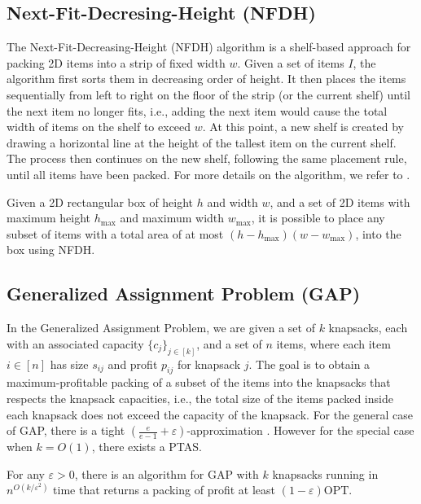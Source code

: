 \documentclass[a4paper,UKenglish,cleveref, autoref, thm-restate]{lipics-v2021}
\newcommand{\eps}{\varepsilon}
\newcommand{\opt}{\mathrm{OPT}}
\begin{document}
\subsection{Next-Fit-Decresing-Height (NFDH)}
\label{appx:NFDH}

The Next-Fit-Decreasing-Height (NFDH) algorithm is a shelf-based approach for packing 2D items into a strip of fixed width $w$. Given a set of items $I$, the algorithm first sorts them in decreasing order of height.
It then places the items sequentially from left to right on the floor of the strip (or the current shelf) until the next item no longer fits, i.e., adding the next item would cause the total width of items on the shelf to exceed $w$. At this point, a new shelf is created by drawing a horizontal line at the height of the tallest item on the current shelf. The process then continues on the new shelf, following the same placement rule, until all items have been packed.
For more details on the algorithm, we refer to \cite{coffman1980performance, christensen2016multidimensional}.


\begin{lemma}
\label{lem:NFDH}
Given a 2D rectangular box of height $h$ and width $w$, and a set of 2D items with maximum height $h_{\max}$ and maximum width $w_{\max}$, it is possible to place any subset of items with a total area of at most $(h-h_{\max})(w-w_{\max})$, into the box using NFDH.
\end{lemma}


\subsection{Generalized Assignment Problem (GAP)}
\label{sec:GAP}
In the Generalized Assignment Problem, we are given a set of $k$ knapsacks, each with an associated capacity $\{c_j\}_{j\in [k]}$, and a set of $n$ items, where each item $i\in [n]$ has size $s_{ij}$ and profit $p_{ij}$ for knapsack $j$. The goal is to obtain a maximum-profitable packing of a subset of the items into the knapsacks that respects the knapsack capacities, i.e., the total size of the items packed inside each knapsack does not exceed the capacity of the knapsack. For the general case of GAP, there is a tight $(\frac{e}{e-1}+\eps)$-approximation \cite{fleischer2011tight}. However for the special case when $k=O(1)$, there exists a PTAS.

\begin{theorem}
    For any $\eps > 0$, there is an algorithm for GAP with $k$ knapsacks running in $n^{O(k/\eps^2)}$ time that returns a packing of profit at least $(1-\eps)\opt$.
\end{theorem}
\end{document}
